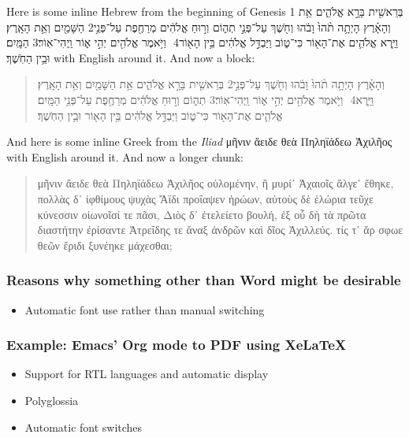\documentclass[11pt]{article}
\begin{document}
Here is some inline Hebrew from the beginning of Genesis 1 \texthebrew{‏בְּרֵאשִׁ֖ית בָּרָ֣א אֱלֹהִ֑ים אֵ֥ת הַשָּׁמַ֖יִם וְאֵ֥ת הָאָֽרֶץ׃ ‎2‏ וְהָאָ֗רֶץ הָיְתָ֥ה תֹ֨הוּ֙ וָבֹ֔הוּ וְחֹ֖שֶׁךְ עַל־פְּנֵ֣י תְה֑וֹם וְר֣וּחַ אֱלֹהִ֔ים מְרַחֶ֖פֶת עַל־פְּנֵ֥י הַמָּֽיִם׃ ‎3‏ וַיֹּ֥אמֶר אֱלֹהִ֖ים יְהִ֣י א֑וֹר וַֽיְהִי־אֽוֹר׃ ‎4‏ וַיַּ֧רְא אֱלֹהִ֛ים אֶת־הָא֖וֹר כִּי־ט֑וֹב וַיַּבְדֵּ֣ל אֱלֹהִ֔ים בֵּ֥ין הָא֖וֹר וּבֵ֥ין הַחֹֽשֶׁךְ׃} with English around it. And now a block:

\begin{quote}
\begin{hebrew}
‏‏בְּרֵאשִׁ֖ית בָּרָ֣א אֱלֹהִ֑ים אֵ֥ת הַשָּׁמַ֖יִם וְאֵ֥ת הָאָֽרֶץ׃ ‎2‏ וְהָאָ֗רֶץ הָיְתָ֥ה תֹ֨הוּ֙ וָבֹ֔הוּ וְחֹ֖שֶׁךְ עַל־פְּנֵ֣י תְה֑וֹם וְר֣וּחַ אֱלֹהִ֔ים מְרַחֶ֖פֶת עַל־פְּנֵ֥י הַמָּֽיִם׃ ‎3‏ וַיֹּ֥אמֶר אֱלֹהִ֖ים יְהִ֣י א֑וֹר וַֽיְהִי־אֽוֹר׃ ‎4‏ וַיַּ֧רְא אֱלֹהִ֛ים אֶת־הָא֖וֹר כִּי־ט֑וֹב וַיַּבְדֵּ֣ל אֱלֹהִ֔ים בֵּ֥ין הָא֖וֹר וּבֵ֥ין הַחֹֽשֶׁךְ׃
\end{hebrew}
\end{quote}

And here is some inline Greek from the \emph{Iliad} μῆνιν ἄειδε θεὰ Πηληϊάδεω Ἀχιλῆος with English around it. And now a longer chunk:

\begin{quote}
μῆνιν ἄειδε θεὰ Πηληϊάδεω Ἀχιλῆος οὐλομένην, ἣ μυρί᾽ Ἀχαιοῖς ἄλγε᾽ ἔθηκε, πολλὰς δ᾽ ἰφθίμους ψυχὰς Ἄϊδι προΐαψεν ἡρώων, αὐτοὺς δὲ ἑλώρια τεῦχε κύνεσσιν οἰωνοῖσί τε πᾶσι, Διὸς δ᾽ ἐτελείετο βουλή, ἐξ οὗ δὴ τὰ πρῶτα διαστήτην ἐρίσαντε Ἀτρεΐδης τε ἄναξ ἀνδρῶν καὶ δῖος Ἀχιλλεύς. τίς τ᾽ ἄρ σφωε θεῶν ἔριδι ξυνέηκε μάχεσθαι;
\end{quote}



\subsubsection{Reasons why something other than Word might be desirable}
\label{sec:org480cdda}

\begin{itemize}
\item Automatic font use rather than manual switching
\end{itemize}

\subsubsection{Example: Emacs' Org mode to PDF using XeLaTeX}
\label{sec:orga742cfd}

\begin{itemize}
\item Support for RTL languages and automatic display
\item Polyglossia
\item Automatic font switches
\end{itemize}
\end{document}
